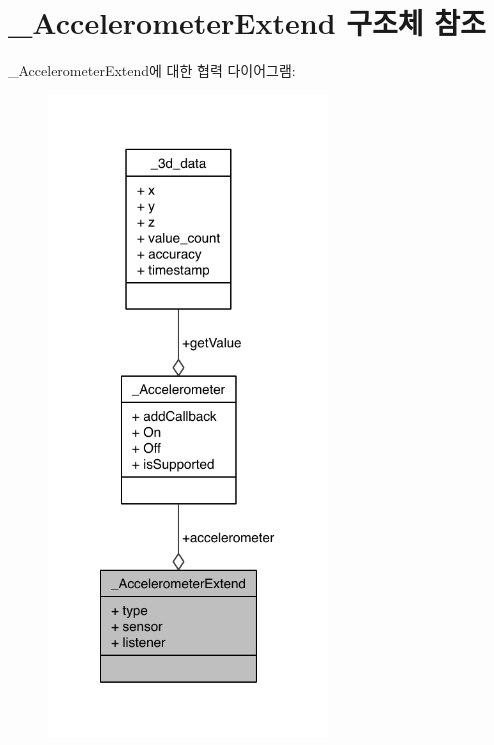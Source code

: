\hypertarget{struct___accelerometer_extend}{\section{\-\_\-\-Accelerometer\-Extend 구조체 참조}
\label{struct___accelerometer_extend}
}


\-\_\-\-Accelerometer\-Extend에 대한 협력 다이어그램\-:\nopagebreak
\begin{figure}[H]
\begin{center}
\leavevmode
\includegraphics[width=210pt]{d5/dcd/struct___accelerometer_extend__coll__graph}
\end{center}
\end{figure}
